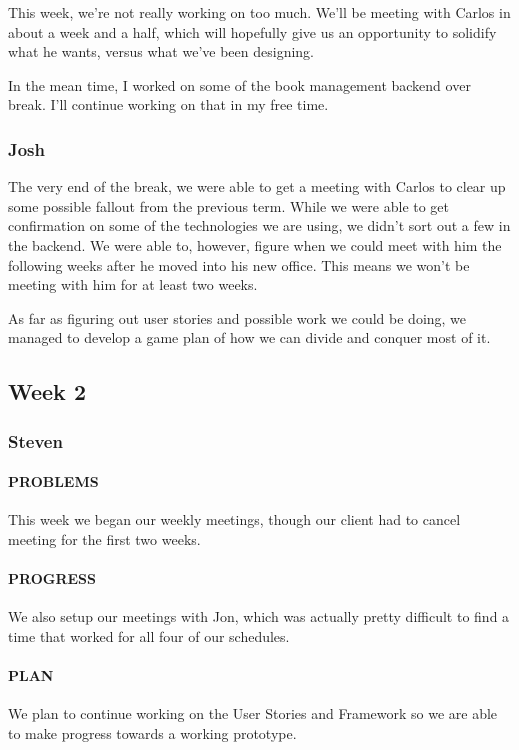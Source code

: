 \documentclass[onecolumn, draftclsnofoot,10pt, compsoc]{IEEEtran}
\begin{document}
	This week, we're not really working on too much. We'll be meeting with Carlos in about a week and a half, which will hopefully give us an opportunity to solidify what he wants, versus what we've been designing. 
	
	In the mean time, I worked on some of the book management backend over break. I'll continue working on that in my free time.
	
	\subsubsection{Josh}
	The very end of the break, we were able to get a meeting with Carlos to clear up some possible fallout from the previous term. While we were able to get confirmation on some of the technologies we are using, we didn't sort out a few in the backend. We were able to, however, figure when we could meet with him the following weeks after he moved into his new office. This means we won't be meeting with him for at least two weeks.
	
	As far as figuring out user stories and possible work we could be doing, we managed to develop a game plan of how we can divide and conquer most of it.
\subsection{Week 2}
	\subsubsection{Steven}
	
	\paragraph{PROBLEMS}
	This week we began our weekly meetings, though our client had to cancel meeting for the first two weeks.
	
	\paragraph{PROGRESS}
	We also setup our meetings with Jon, which was actually pretty difficult to find a time that worked for all four of our schedules.
	
	\paragraph{PLAN}
	We plan to continue working on the User Stories and Framework so we are able to make progress towards a working prototype.
	
\end{document}
